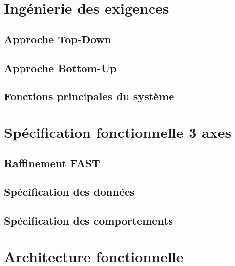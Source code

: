 \chapter{Ingénierie des exigences}
\section{Approche Top-Down}
\label{sec:top-down}

\section{Approche Bottom-Up}

\section{Fonctions principales du système}

\chapter{Spécification fonctionnelle  3 axes}

\section{Raffinement FAST}
\section{Spécification des données}
\section{Spécification des comportements}


\chapter{Architecture fonctionnelle}


